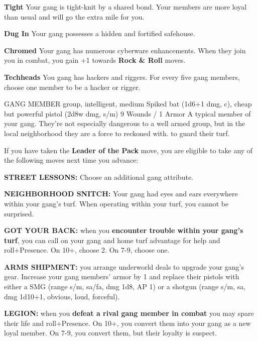 \documentclass[oneside,10pt]{article}
\begin{document}
\begin{multicols}{2}
\begin{dent}
\textbf{Tight} Your gang is tight-knit by a shared
bond. Your members are more loyal than usual and
will go the extra mile for you.

\textbf{Dug In} Your gang possesses a hidden and
fortified safehouse. 

\textbf{Chromed} Your gang has numerous cyberware
enhancements. When they join you in combat, you
gain +1 towards \textbf{Rock \& Roll} moves.

\textbf{Techheads} You gang has hackers and
riggers. For every five gang members, choose one
member to be a hacker or rigger.

\end{dent}

\critterspec
{GANG MEMBER}
{group, intelligent, medium}
{Spiked bat (1d6+1 dmg, c), cheap but powerful pistol (2d8w dmg, s/m)}
{9 Wounds / 1 Armor}
{A typical member of your gang. They're not
  especially dangerous to a well armed group, but
  in the local neighborhood they are a force to
  reckoned with.}
{to guard their turf.}
{}

If you have taken the \textbf{Leader of the Pack}
move, you are eligible to take any of the
following moves next time you advance:

\textbf{STREET LESSONS:} Choose an additional gang attribute.

\textbf{NEIGHBORHOOD SNITCH:} Your gang had eyes
and ears everywhere within your gang's turf. When
operating within your turf, you cannot be
surprised. 

\textbf{GOT YOUR BACK:} when you \textbf{encounter
  trouble within your gang's turf}, you can call
on your gang and home turf advantage for help and roll+Presence. On 10+,
choose 2. On 7-9, choose one.
\begin{moveoptions}
 


\end{moveoptions}

\textbf{ARMS SHIPMENT:} you arrange underworld
deals to upgrade your gang's gear. Increase your
gang members' armor by 1 and replace their pistols
with either a SMG (range s/m, sa/fa, dmg 1d8, AP
1) or a shotgun (range s/m, sa, dmg 1d10+1, obvious, loud,
forceful).

\textbf{LEGION:} when you \textbf{defeat a rival
  gang member in combat} you may spare their life
and roll+Presence. On 10+, you convert them into
your gang as a new loyal member. On 7-9, you convert
them, but their loyalty is suspect. 

\end{multicols}
\end{document}
